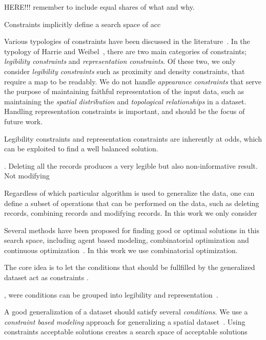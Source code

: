 \documentclass[11pt, oneside]{article}   	%
\begin{document}
HERE!!! remember to include equal shares of what and why.


Constraints implicitly define a search space of acc

Various typologies of constraints have been discussed in the literature~\cite{beard1991constraints,harrie2007modelling}. In the typology of Harrie and Weibel~\cite{harrie2007modelling}, there are two main categories of constraints; \emph{legibility constraints} and \emph{representation constraints}. Of these two, we only consider \emph{legibility constraints} such as proximity and density constraints, that require a map to be readably. We do not handle \emph{appearance constraints} that serve the purpose of maintaining faithful representation of the input data, such as maintaining the \emph{spatial distribution} and \emph{topological relationships} in a dataset. Handling representation constraints is important, and should be the focus of future work.

Legibility constraints and representation constraints are inherently at odds, which can be exploited to find a well balanced solution.

. Deleting all the records produces a very legible but also non-informative result. Not modifying 



Regardless of which particular algorithm is used to generalize the data, one can define a subset of operations that can be performed on the data, such as deleting records, combining records and modifying records. In this work we only consider

Several methods have been proposed for finding good or optimal solutions in this search space, including agent based modeling, combinatorial optimization and continuous optimization~\cite{harrie2007modelling}. In this work we use combinatorial optimization. 



 The core idea is to let the conditions that should be fullfilled by the generalized dataset act as constraints .


, were conditions can be grouped into legibility and representation~\cite{harrie2007modelling}.




A good generalization of a dataset should satisfy several \emph{conditions}.  We use a \emph{constraint based modeling} approach for generalizing a spatial dataset~\cite{harrie1999constraint}. Using constraints acceptable solutions creates a search space of acceptable solutions
\end{document}
